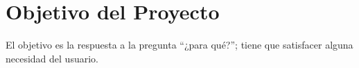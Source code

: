 \section{Objetivo del Proyecto}
    El objetivo es la respuesta a la pregunta “¿para qué?”; tiene que satisfacer
    alguna necesidad del usuario.



